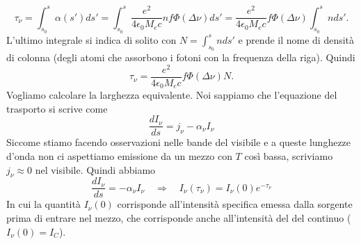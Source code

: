 \[
    \tau_\nu = \int_{s_0}^{s} \alpha(s')ds' = \int_{s_0}^{s}\frac{e^2}{4\epsilon_0 M_e c}nf\Phi(\Delta \nu) ds'= \frac{e^2}{4\epsilon_0 M_e c}f\Phi(\Delta \nu)\int_{s_0}^{s}nds'.
\]
L'ultimo integrale si indica di solito con $N=\int_{s_0}^{s}nds'$ e prende il nome di densità di colonna (degli atomi che assorbono i fotoni con la frequenza della riga). Quindi
\[
    \tau_\nu = \frac{e^2}{4\epsilon_0 M_e c}f\Phi(\Delta \nu) N.
\]
Vogliamo calcolare la larghezza equivalente. Noi sappiamo che l'equazione del trasporto si scrive come 
\[
    \frac{dI_\nu}{ds}=j_\nu-\alpha_\nu I_\nu
\]
Siccome stiamo facendo osservazioni nelle bande del visibile e a queste lunghezze d'onda non ci aspettiamo emissione da un mezzo con $T$ così bassa, scriviamo $j_\nu \approx 0$ nel visibile. Quindi abbiamo
\[
    \frac{dI_\nu}{ds}=-\alpha_\nu I_\nu \quad \Rightarrow \quad  I_\nu(\tau_\nu)=I_\nu(0)e^{-\tau_\nu}
\]
In cui la quantità $I_\nu(0)$ corrisponde all'intensità specifica emessa dalla sorgente prima di entrare nel mezzo, che corrisponde anche all'intensità del del continuo ($I_\nu(0) = I_C$).\\
\begin{center}
\end{center}
